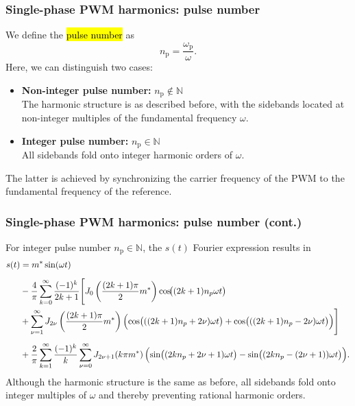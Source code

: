 \begin{frame}
    \frametitle{Single-phase PWM harmonics:  pulse number}
    We define the \hl{pulse number} as
    \begin{equation}
        n_\mathrm{p}=\frac{\omega_\mathrm{p}}{\omega}.
    \end{equation}
    Here, we can distinguish two cases:
    \begin{itemize}
        \item \textbf{Non-integer pulse number:} $n_\mathrm{p}\notin\mathbb{N}$\\
              The harmonic structure is as described before, with the sidebands located at non-integer multiples of the fundamental frequency $\omega$.
        \item \textbf{Integer pulse number:} $n_\mathrm{p}\in\mathbb{N}$\\
              All sidebands fold onto integer harmonic orders of $\omega$.
    \end{itemize}
    The latter is achieved by synchronizing the carrier frequency of the PWM to the fundamental frequency of the reference.
\end{frame}

\begin{frame}
    \frametitle{Single-phase PWM harmonics:  pulse number (cont.)}
    For integer pulse number $n_\mathrm{p}\in\mathbb{N}$, the $s(t)$ Fourier expression results in
    \begin{equation*}
        \begin{aligned}
            s(t) & =  m^* \sin(\omega t)
            \\[0.5em]
                 & -\frac{4}{\pi}\sum_{k=0}^{\infty}\frac{(-1)^k}{2k+1}
            \Bigg[
                J_0\left(\frac{(2k+1)\pi}{2}m^*\right)\cos\!\bigl((2k+1)n_p\omega t\bigr) \\
                &
                +\sum_{\nu=1}^{\infty}
                J_{2\nu}\left(\frac{(2k+1)\pi}{2}m^*\right)
                \Bigl(
                \cos\bigl(((2k+1)n_p+2\nu)\omega t\bigr)
                +\cos\bigl(((2k+1)n_p-2\nu)\omega t\bigr)
                \Bigr)
                \Bigg]
            \\[0.5em]
                 & +\frac{2}{\pi}\sum_{k=1}^{\infty}\frac{(-1)^k}{k}
            \sum_{\nu=0}^{\infty}
            J_{2\nu+1}\!\left(k\pi m^*\right)
            \Bigl(
            \sin\bigl((2kn_p+2\nu+1)\omega t\bigr)
            -\sin\bigl((2kn_p-(2\nu+1))\omega t\bigr)
            \Bigr).
        \end{aligned}
    \end{equation*}
    Although the harmonic structure is the same as before, all sidebands fold onto integer multiples of $\omega$ and thereby preventing rational harmonic orders.
\end{frame}

